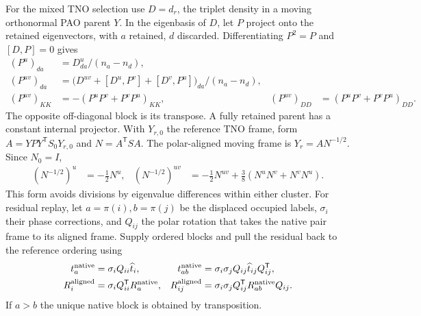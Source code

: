\documentclass[11pt]{article}
\begin{document}
For the mixed TNO selection use $D=d_r$, the triplet density in a moving
orthonormal PAO parent $Y$. In the eigenbasis of $D$, let $P$ project onto
the retained eigenvectors, with $a$ retained, $d$ discarded. Differentiating
$P^2=P$ and $[D,P]=0$ gives
\begin{align}
 (P^u)_{da}&=D^u_{da}/(n_a-n_d),\\
 (P^{uv})_{da}&=\big(D^{uv}+[D^u,P^v]+[D^v,P^u]\big)_{da}/(n_a-n_d),\\
 (P^{uv})_{KK}&=-(P^uP^v+P^vP^u)_{KK},&
 (P^{uv})_{DD}&=(P^uP^v+P^vP^u)_{DD}.
\end{align}
The opposite off-diagonal block is its transpose. A fully retained parent
has a constant internal projector. With $Y_{r,0}$ the reference TNO frame,
form $A=YPY^{\mathsf T}S_0Y_{r,0}$ and $N=A^{\mathsf T}SA$. The polar-aligned
moving frame is $Y_r=A N^{-1/2}$. Since $N_0=I$,
\begin{align}
 (N^{-1/2})^u&=-\tfrac12N^u,&
 (N^{-1/2})^{uv}&=-\tfrac12N^{uv}
                     +\tfrac38(N^uN^v+N^vN^u).
\end{align}
This form avoids divisions by eigenvalue differences within either cluster.
For residual replay, let $a=\pi(i), b=\pi(j)$ be the displaced occupied
labels, $\sigma_i$ their phase corrections, and $Q_{ij}$ the polar rotation
that takes the native pair frame to its aligned frame. Supply ordered blocks
and pull the residual back to the reference ordering using
\begin{align}
 t_a^{\rm native}&=\sigma_i Q_{ii}\widehat t_i,&
 t_{ab}^{\rm native}&=\sigma_i\sigma_jQ_{ij}\widehat t_{ij}Q_{ij}^{\mathsf T},\\
 R_i^{\rm aligned}&=\sigma_i Q_{ii}^{\mathsf T}R_a^{\rm native},&
 R_{ij}^{\rm aligned}&=\sigma_i\sigma_j Q_{ij}^{\mathsf T}R_{ab}^{\rm native} Q_{ij}.
\end{align}
If $a>b$ the unique native block is obtained by transposition.
\end{document}
